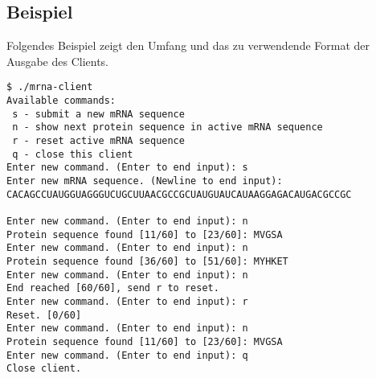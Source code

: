 \subsection*{Beispiel}

Folgendes Beispiel zeigt den Umfang und das zu verwendende Format der
Ausgabe des Clients.


\begin{verbatim}
$ ./mrna-client
Available commands:
 s - submit a new mRNA sequence
 n - show next protein sequence in active mRNA sequence
 r - reset active mRNA sequence
 q - close this client
Enter new command. (Enter to end input): s
Enter new mRNA sequence. (Newline to end input):
CACAGCCUAUGGUAGGGUCUGCUUAACGCCGCUAUGUAUCAUAAGGAGACAUGACGCCGC

Enter new command. (Enter to end input): n
Protein sequence found [11/60] to [23/60]: MVGSA
Enter new command. (Enter to end input): n
Protein sequence found [36/60] to [51/60]: MYHKET
Enter new command. (Enter to end input): n
End reached [60/60], send r to reset.
Enter new command. (Enter to end input): r
Reset. [0/60]
Enter new command. (Enter to end input): n
Protein sequence found [11/60] to [23/60]: MVGSA
Enter new command. (Enter to end input): q
Close client.
\end{verbatim}




\osueguidelinesthree



